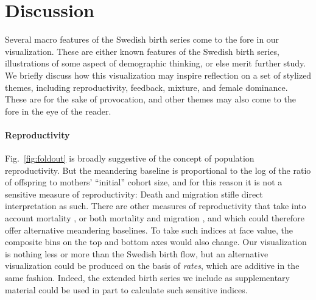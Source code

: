 \documentclass{article}
\newcommand\todo[1]{\textcolor{red}{[TODO: #1]}}
\begin{document}
\section{Discussion}
Several macro features of the Swedish birth series come to the fore in our visualization. These are either known features of the Swedish birth series, illustrations of some aspect of demographic thinking, or else merit further study. We briefly discuss how this visualization may inspire reflection on a set of stylized themes, including reproductivity, feedback, mixture, and female dominance. These are for the sake of provocation, and other themes may also come to the fore in the eye of the reader. %

\paragraph{Reproductivity}
Fig.~\ref{fig:foldout} is broadly suggestive of the concept of population reproductivity. But the meandering baseline is proportional to the log of the ratio of offspring to mothers' ``initial'' cohort size, and for this reason it is not a sensitive measure of reproductivity: Death and migration stifle direct interpretation as such. There are other measures of reproductivity that take into account mortality \citep{kuczynski1932fertility}, or both mortality and migration \citep[][inter alia]{hyrenius1951reproduction,ortega2007birth,preston2007intrinsic,wilson2013migration,ediev2014new}, and which could therefore offer alternative meandering baselines. To take such indices at face value, the composite bins on the top and bottom axes would also change. Our visualization is nothing less or more than the Swedish birth flow, but an alternative visualization could be produced on the basis of \emph{rates}, which are additive in the same fashion. Indeed, the extended birth series we include as supplementary material could be used in part to calculate such sensitive indices. 
\end{document}
